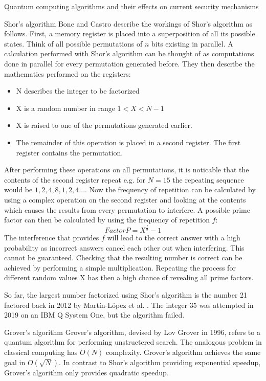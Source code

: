 \documentclass[aps,preprintnumbers,twocolumn]{revtex4}
\begin{document}
\begin{section}{Quantum computing algorithms and their effects on current security mechanisms}
\begin{subsection}{Shor's algorithm}
Bone and Castro \cite[p.6-9]{Bone} describe the workings of Shor's algorithm as follows. First, a memory register is placed into a superposition of all its possible states. Think of all possible permutations of $n$ bits existing in parallel.
A calculation performed with Shor's algorithm can be thought of as computations done in parallel for every permutation generated before. 
They then describe the mathematics performed on the registers: 
\begin{itemize} 
    \item N describes the integer to be factorized
    \item X is a random number in range $1 < X < N-1$
    \item X is raised to one of the permutations generated earlier.
    \item The remainder of this operation is placed in a second register. The first register contains the permutation.
\end{itemize}
After performing these operations on all permutations, it is noticable that the contents of the second register repeat e.g. for $N = 15$ the repeating sequence would be $1,2,4,8,1,2,4...$.
Now the frequency of repetition can be calculated by using a complex operation on the second register and looking at the contents which causes the results from every permutation to interfere. A possible prime factor can then be calculated by using the frequency of repetition $f$:
\begin{equation}
Factor P = X^{\frac{f}{2}}-1
\end{equation}
The interference that provides $f$ will lead to the correct answer with a high probability as incorrect answers cancel each other out when interfering. This cannot be guaranteed. Checking that the resulting number is correct can be achieved by performing a simple multiplication. Repeating the process for different random values X has then a high chance of revealing all prime factors.

So far, the largest number factorized using Shor's algorithm 
 is the number 21 factored back in 2012 by Martín-López et al. \cite{article}. 
The integer 35 was attempted in 2019 on an IBM Q System One, 
but the algorithm failed. 
\end{subsection}

\begin{subsection}{Grover's algorithm}
Grover's algorithm, devised by Lov Grover in 1996,
refers to a quantum algorithm for performing unstructered search. 
The analogous problem in classical computing has $O(N)$ complexity. 
Grover's algorithm achieves the same goal in $O(\sqrt{N})$. 
In contrast to Shor's algorithm providing exponential speedup, 
Grover's algorithm only provides quadratic speedup. 


\end{subsection}
\end{section}
\end{document}
